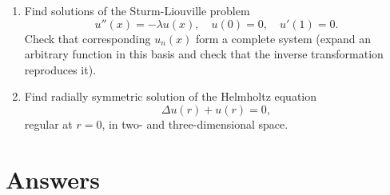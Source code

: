 \documentclass[a4paper,11pt]{article}
\begin{document}
\begin{enumerate}
\item\label{item:23} Find solutions of the Sturm-Liouville problem
\[
u''(x)=-\lambda u(x), \quad u(0)=0, \quad u'(1)=0.
\]
Check that corresponding \(u_n(x)\) form a complete system (expand an arbitrary function in this basis and check that the inverse transformation reproduces it).

\item\label{item:44} Find radially symmetric solution of the Helmholtz equation
\[\Delta u(r)+u(r)=0,\]
regular at \(r=0\), in two- and three-dimensional space.

\end{enumerate}

\newpage

\section*{Answers}
\end{document}
